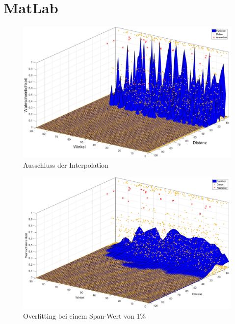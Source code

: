 \chapter{MatLab}

\begin{figure}[H]
\centering
\includegraphics[scale=0.34]{se-wa-jpg/inter}
\caption{Ausschluss der Interpolation}
\label{inter}
\end{figure}

\begin{figure}[H]
\centering
\includegraphics[scale=0.34]{se-wa-jpg/splinewdTM}
\caption{Overfitting bei einem Span-Wert von 1\%}
\label{splinewdTM}
\end{figure}

